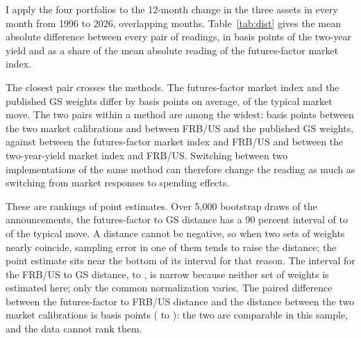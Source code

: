 \documentclass[11pt]{article}
\begin{document}
I apply the four portfolios to the 12-month change in the three assets in every month from 1996 to 2026,  overlapping months. Table~\ref{tab:dist} gives the mean absolute difference between every pair of readings, in basis points of the two-year yield and as a share of the mean absolute reading of the futures-factor market index.



The closest pair crosses the methods. The futures-factor market index and the published GS weights differ by  basis points on average,  of the typical market move. The two pairs within a method are among the widest:  basis points between the two market calibrations and  between FRB/US and the published GS weights, against  between the futures-factor market index and FRB/US and  between the two-year-yield market index and FRB/US. Switching between two implementations of the same method can therefore change the reading as much as switching from market responses to spending effects.

These are rankings of point estimates. Over 5,000 bootstrap draws of the announcements, the futures-factor to GS distance has a 90 percent interval of  to  of the typical move. A distance cannot be negative, so when two sets of weights nearly coincide, sampling error in one of them tends to raise the distance; the point estimate sits near the bottom of its interval for that reason. The interval for the FRB/US to GS distance,  to , is narrow because neither set of weights is estimated here; only the common normalization varies. The paired difference between the futures-factor to FRB/US distance and the distance between the two market calibrations is  basis points ( to ): the two are comparable in this sample, and the data cannot rank them.
\end{document}
